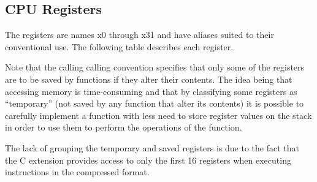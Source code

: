 

\subsection{CPU Registers}
\label{cpuregs}

The registers are names x0 through x31 and have aliases suited to their 
conventional use.  The following table describes each register.  

Note 
that the calling calling convention specifies that only some 
of the registers are to be saved by functions if they alter their contents.
The idea being that accessing memory is time-consuming and that by
classifying some registers as ``temporary'' (not saved by any function
that alter its contents) it is possible to carefully implement a function
with less need to store register values on the stack in order to use them
to perform the operations of the function.

The lack of grouping the temporary and saved registers is due to the
fact that the C extension %
provides access to only the first 16 registers when executing instructions 
in the compressed format.  


